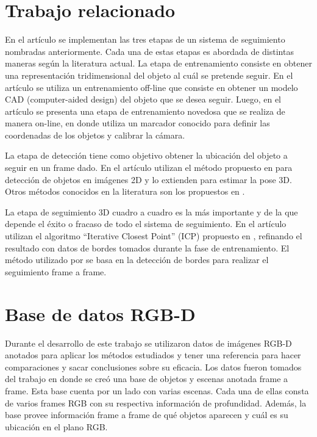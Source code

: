\section{Trabajo relacionado}

En el artículo \cite{park2011texture} se implementan las tres etapas de un sistema de seguimiento nombradas anteriormente. Cada una de estas etapas es abordada de distintas maneras según la literatura actual.
La etapa de entrenamiento consiste en obtener una representación tridimensional del objeto al cuál se pretende seguir. En el artículo \cite{drummond1999real} se utiliza un entrenamiento off-line que consiste en obtener un modelo CAD (computer-aided design) del objeto que se desea seguir. Luego, en el artículo \cite{park2011texture} se presenta una etapa de entrenamiento novedosa que se realiza de manera on-line, en donde utiliza un marcador conocido para definir las coordenadas de los objetos y calibrar la cámara.

La etapa de detección tiene como objetivo obtener la ubicación del objeto a seguir en un frame dado. En el artículo \cite{park2011texture} utilizan el método propuesto en \cite{hinterstoisser2010dominant} para detección de objetos en imágenes 2D y lo extienden para estimar la pose 3D. Otros métodos conocidos en la literatura son los propuestos en \cite{brunelli2009template,korman13fast}. 

La etapa de seguimiento 3D cuadro a cuadro es la más importante y de la que depende el éxito o fracaso de todo el sistema de seguimiento. En el artículo \cite{park2011texture} utilizan el algoritmo ``Iterative Closest Point'' (ICP) propuesto en \cite{zhang94icp,besl92icp}, refinando el resultado con datos de bordes tomados durante la fase de entrenamiento. El método utilizado por \cite{drummond1999real} se basa en la detección de bordes para realizar el seguimiento frame a frame.

\section{Base de datos RGB-D}\label{base_rgbd}
Durante el desarrollo de este trabajo se utilizaron datos de imágenes RGB-D anotados para aplicar los métodos estudiados y tener una referencia para hacer comparaciones y sacar conclusiones sobre su eficacia. Los datos fueron tomados del trabajo \cite{lai2011large} en donde se creó una base de objetos y escenas anotada frame a frame. Esta base cuenta por un lado con varias escenas. Cada una de ellas consta de varios frames RGB con su respectiva información de profundidad. Además, la base provee información frame a frame de qué objetos aparecen y cuál es su ubicación en el plano RGB.


